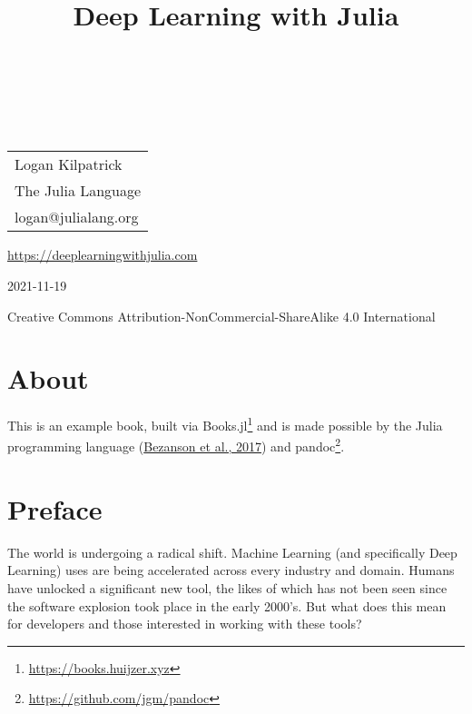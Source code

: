 \documentclass[
  notoc %
]{tufte-book}
\title{Deep Learning with Julia}
\author{\noindent{Logan Kilpatrick}\\[3mm] }
\date{}
\DeclareRobustCommand{\href}[2]{#2\footnote{\url{#1}}}
\begin{document}
\makeatletter
\thispagestyle{empty}
\vfill
{\Huge\bf
\noindent
\@title
}\\[1in]
{\Large
\noindent
\@author
}
\makeatother

\makeatletter
\newpage
\thispagestyle{empty}
\vfill
{\noindent
\begin{tabular}{l} Logan Kilpatrick\\ The Julia Language\\ logan@julialang.org\\ \end{tabular}
}
\vfill
{\small
\url{https://deeplearningwithjulia.com}

2021-11-19

Creative Commons Attribution-NonCommercial-ShareAlike 4.0 International
}
\makeatother


\frontmatter
\mainmatter
{}

\setcounter{tocdepth}{1}
\tableofcontents

\justifying

\setlength{\parindent}{0pt}

\hypertarget{sec:about}{%
\chapter{About}\label{sec:about}}

This is an example book, built via
\href{https://books.huijzer.xyz}{Books.jl} and is made possible by the
Julia programming language
(\protect\hyperlink{ref-bezanson2017julia}{Bezanson et al., 2017}) and
\href{https://github.com/jgm/pandoc}{pandoc}.

\hypertarget{sec:preface}{%
\chapter{Preface}\label{sec:preface}}

The world is undergoing a radical shift. Machine Learning (and
specifically Deep Learning) uses are being accelerated across every
industry and domain. Humans have unlocked a significant new tool, the
likes of which has not been seen since the software explosion took place
in the early 2000's. But what does this mean for developers and those
interested in working with these tools?
\end{document}
